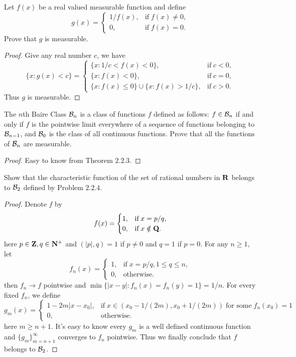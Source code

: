 \begin{pro}%
	Let $f(x)$ be a real valued measurable function and define
	\[g(x)=\begin{cases}1/f(x),&\mbox{if}\;f(x)\neq 0,\\0,&\mbox{if}\;f(x)=0.\end{cases}\]
	Prove that $g$ is measurable.
\end{pro}
\begin{proof}
	Give any real number $c$, we have
	\[\{x\colon g(x)<c\}=\begin{cases}
	\{x\colon 1/c<f(x)<0\},&\mbox{if}\;c<0,\\
	\{x\colon f(x)<0\},&\mbox{if}\;c=0,\\
	\{x\colon f(x)\leq 0\}\cup\{x\colon f(x)>1/c\},&\mbox{if}\;c>0.\end{cases}
	\] Thus $g$ is measurable.
\end{proof}

\begin{pro}%
	The $n$th Baire Class $\mathcal{B}_n$ is a class of functions $f$ defined as follows: $f\in\mathcal{B}_n$ if and only if $f$ is the pointwise limit everywhere of a sequence of functions belonging to $\mathcal{B}_{n-1}$, and $\mathcal{B}_0$ is the class of all continuous functions. Prove that all the functions of $\mathcal{B}_n$ are measurable.
\end{pro}
\begin{proof}
	Easy to know from Theorem $2.2.3$.
\end{proof}

\begin{pro}%
	Show that the characteristic function of the set of rational numbers in $\mathbf{R}$ belongs to $\mathcal{B}_2$ defined by Problem $2.2.4$.
\end{pro}
\begin{proof}
	Denote $f$ by
	\[f(x)=\begin{cases} 1,&\mbox{if}\;x=p/q,\\0,&\mbox{if}\;x\notin\mathbf{Q}.\end{cases}\]
	here $p\in\mathbf{Z},q\in\mathbf{N}^+$ and $(|p|,q)=1$ if $p\neq 0$ and $q=1$ if $p=0$.
	For any $n\geq 1$, let 
	\[f_n(x)=\begin{cases} 1,&\mbox{if}\;x=p/q,1\leq q\leq n,\\0,&\mbox{otherwise}.\end{cases}\]
	then $f_n\to f$ pointwise and $\min\{|x-y|\colon f_n(x)=f_n(y)=1\}=1/n$. For every fixed $f_n$, we define
    \[g_m(x)=\begin{cases} 1-2m|x-x_0|,&\mbox{if}\;x\in(x_0-1/(2m),x_0+1/(2m))\;\mbox{for some}\;f_n(x_0)=1\\0,&\mbox{otherwise}.\end{cases}\]
    here $m\geq n+1$. It's easy to know every $g_m$ is a well defined continuous function and $\{g_m\}_{m=n+1}^\infty$ converges to $f_n$ pointwise. Thus we finally conclude that $f$ belongs to $\mathcal{B}_2$.
\end{proof}

